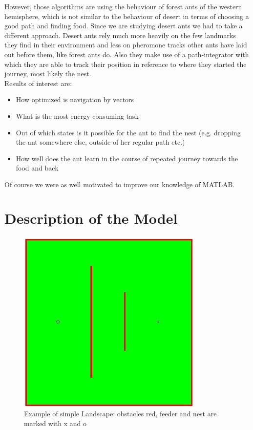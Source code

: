 \documentclass[11pt]{article}
\begin{document}
However, those algorithms are using the behaviour of forest ants of the western hemisphere, which is not similar to the behaviour of desert in terms of choosing a good path and finding food. Since we are studying desert ants we had to take a different approach. Desert ants rely much more heavily on the few landmarks they find in their environment and less on pheromone tracks other ants have laid out before them, like forest ants do. Also they make use of a path-integrator with which they are able to track their position in reference to where they started the journey, most likely the nest.\\
Results of interest are: 
\begin{itemize}
\item How optimized is navigation by vectors 
\item What is the most energy-consuming task
\item Out of which states is it possible for the ant to find the nest (e.g. dropping the ant somewhere else, outside of her regular path etc.)
\item How well does the ant learn in the course of repeated journey towards the food and back
\end{itemize}
Of course we were as well motivated to improve our knowledge of MATLAB\texttrademark.
\newpage

\section{Description of the Model}

\begin{figure}[h]
	\centering
	\includegraphics[scale=0.6]{../code/landscape.jpg}
	\caption[Sample Landscape]{Example of simple Landscape: obstacles red, feeder and nest are marked with x and o}
\end{figure}
\newpage
\end{document}
